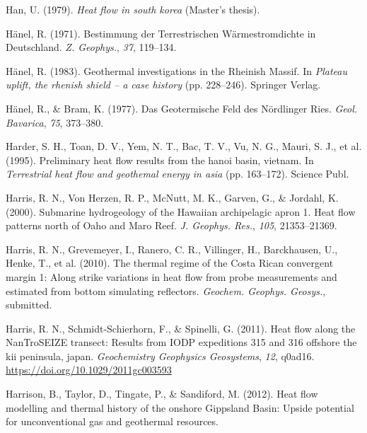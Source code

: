 \begin{CSLReferences}{1}{1}
\leavevmode{}%
Han, U. (1979). \emph{Heat flow in south korea} (Master's thesis).

\leavevmode{}%
Hänel, R. (1971). Bestimmung der {Terrestrischen Wärmestromdichte in Deutschland}. \emph{Z. Geophys.}, \emph{37}, 119--134.

\leavevmode{}%
Hänel, R. (1983). Geothermal investigations in the {Rheinish Massif}. In \emph{Plateau uplift, the rhenish shield -- a case history} (pp. 228--246). Springer Verlag.

\leavevmode{}%
Hänel, R., \& Bram, K. (1977). Das {Geotermische Feld des Nördlinger Ries}. \emph{Geol. Bavarica}, \emph{75}, 373--380.

\leavevmode{}%
Harder, S. H., Toan, D. V., Yem, N. T., Bac, T. V., Vu, N. G., Mauri, S. J., et al. (1995). Preliminary heat flow results from the hanoi basin, vietnam. In \emph{Terrestrial heat flow and geothemal energy in asia} (pp. 163--172). Science Publ.

\leavevmode{}%
Harris, R. N., Von Herzen, R. P., McNutt, M. K., Garven, G., \& Jordahl, K. (2000). Submarine hydrogeology of the {Hawaiian} archipelagic apron {1. Heat flow patterns north of Oaho and Maro Reef}. \emph{J. Geophys. Res.}, \emph{105}, 21353--21369.

\leavevmode{}%
Harris, R. N., Grevemeyer, I., Ranero, C. R., Villinger, H., Barckhausen, U., Henke, T., et al. (2010). The thermal regime of the {Costa Rican} convergent margin 1: Along strike variations in heat flow from probe measurements and estimated from bottom simulating reflectors. \emph{Geochem. Geophys. Geosys.}, submitted.

\leavevmode{}%
Harris, R. N., Schmidt-Schierhorn, F., \& Spinelli, G. (2011). Heat flow along the NanTroSEIZE transect: Results from IODP expeditions 315 and 316 offshore the kii peninsula, japan. \emph{Geochemistry Geophysics Geosystems}, \emph{12}, q0ad16. \url{https://doi.org/10.1029/2011gc003593}

\leavevmode{}%
Harrison, B., Taylor, D., Tingate, P., \& Sandiford, M. (2012). Heat flow modelling and thermal history of the onshore {Gippsland Basin}: Upside potential for unconventional gas and geothermal resources.


\end{CSLReferences}
